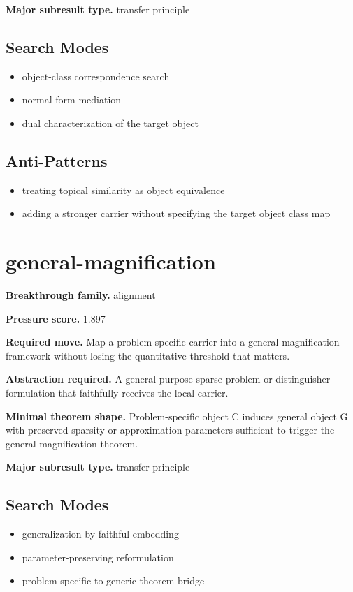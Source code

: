 \documentclass[11pt]{article}
\begin{document}
\textbf{Major subresult type.} transfer principle

\subsection*{Search Modes}
\begin{itemize}[leftmargin=*,itemsep=0.2em]
\item object-class correspondence search
\item normal-form mediation
\item dual characterization of the target object
\end{itemize}
\subsection*{Anti-Patterns}
\begin{itemize}[leftmargin=*,itemsep=0.2em]
\item treating topical similarity as object equivalence
\item adding a stronger carrier without specifying the target object class map
\end{itemize}
\section{general-magnification}
\textbf{Breakthrough family.} alignment

\textbf{Pressure score.} 1.897

\textbf{Required move.} Map a problem-specific carrier into a general magnification framework without losing the quantitative threshold that matters.

\textbf{Abstraction required.} A general-purpose sparse-problem or distinguisher formulation that faithfully receives the local carrier.

\textbf{Minimal theorem shape.} Problem-specific object C induces general object G with preserved sparsity or approximation parameters sufficient to trigger the general magnification theorem.

\textbf{Major subresult type.} transfer principle

\subsection*{Search Modes}
\begin{itemize}[leftmargin=*,itemsep=0.2em]
\item generalization by faithful embedding
\item parameter-preserving reformulation
\item problem-specific to generic theorem bridge
\end{itemize}
\end{document}
